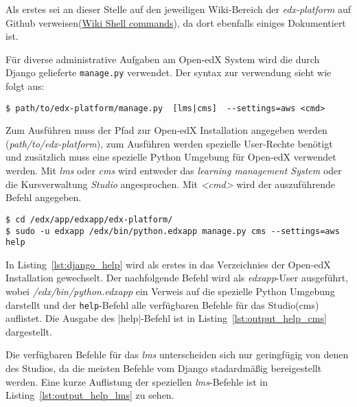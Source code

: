 \documentclass{scrartcl}
\begin{document}
Als erstes sei an dieser Stelle auf den jeweiligen Wiki-Bereich der \textit{edx-platform} auf Github verweisen(\href{https://github.com/edx/edx-platform/wiki/Shell-commands}{Wiki Shell commands}), da dort ebenfalls einiges Dokumentiert ist.

Für diverse administrative Aufgaben am Open-edX System wird die durch Django gelieferte \lstinline|manage.py| verwendet. Der syntax zur verwendung sieht wie folgt aus:

\begin{lstlisting}
$ path/to/edx-platform/manage.py  [lms|cms]  --settings=aws <cmd>
\end{lstlisting}

Zum Ausführen muss der Pfad zur Open-edX Installation angegeben werden (\textit{path/to/edx-platform}), zum Ausführen werden spezielle User-Rechte benötigt und zusätzlich muss eine spezielle Python Umgebung für Open-edX verwendet werden. Mit \textit{lms} oder \textit{cms} wird entweder das \textit{learning management System} oder die Kursverwaltung \textit{Studio} angesprochen. Mit \textit{<cmd>} wird der auszuführende Befehl angegeben.

\begin{lstlisting}[caption={help command}, label=lst:django_help]
$ cd /edx/app/edxapp/edx-platform/
$ sudo -u edxapp /edx/bin/python.edxapp manage.py cms --settings=aws help
\end{lstlisting}

In Listing~\ref{lst:django_help} wird als erstes in das Verzeichnies der Open-edX Installation gewechselt. Der nachfolgende Befehl wird als \textit{edxapp}-User ausgeführt, wobei \textit{/edx/bin/python.edxapp} ein Verweis auf die spezielle Python Umgebung darstellt und der \lstinline|help|-Befehl alle verfügbaren Befehle für das Studio(cms) auflistet. Die Ausgabe des |help|-Befehl ist in Listing~\ref{lst:output_help_cms} dargestellt.

Die verfügbaren Befehle für das \textit{lms} unterscheiden sich nur geringfügig von denen des Studios, da die meisten Befehle vom Django stadardmäßig bereigestellt werden. Eine kurze Auflistung der speziellen \textit{lms}-Befehle ist in Listing~\ref{lst:output_help_lms} zu sehen.
\end{document}
